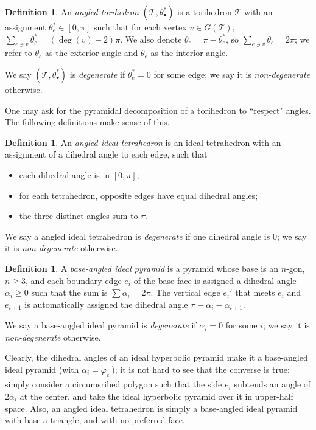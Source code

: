 \documentclass[11pt]{amsart}
\newcommand{\sT}{{\mathcal{T}}}
\newcommand{\vphi}{\varphi}
\theoremstyle{plain}
\theoremstyle{definition}
\newtheorem{define}[theorem]{Definition}
\newtheorem{definition}[theorem]{Definition}
\begin{document}
\begin{definition}
An \emph{angled torihedron} $(\sT, \theta_\bullet^*)$
is a torihedron $\sT$ with
an assignment $\theta_e^* \in [0,\pi]$
such that for each vertex $v \in G(\sT)$,
$\sum_{e \ni v} \theta_e^* = (\deg(v) - 2)\pi$.
We also denote $\theta_e = \pi - \theta_e^*$,
so $\sum_{e \ni v} \theta_e = 2\pi$;
we refer to $\theta_e$ as the exterior angle
and $\theta_e$ as the interior angle.


We say $(\sT, \theta_\bullet^*)$ is \emph{degenerate}
if $\theta_e^* = 0$ for some edge;
we say it is \emph{non-degenerate} otherwise.
\end{definition}


One may ask for the pyramidal decomposition of a torihedron
to ``respect" angles. The following definitions make sense of this.

\begin{define}
An \emph{angled ideal tetrahedron} is an ideal tetrahedron with an assignment of a dihedral angle
to each edge, such that
\begin{itemize}
\item each dihedral angle is in $[0, \pi]$;
\item for each tetrahedron, opposite edges have equal dihedral angles;
\item the three distinct angles sum to $\pi$.
\end{itemize}

We say a angled ideal tetrahedron is \emph{degenerate} if
one dihedral angle is 0; we say it is \emph{non-degenerate} otherwise.
\end{define}


\begin{define}
A \emph{base-angled ideal pyramid}
is a pyramid whose base is an $n$-gon, $n \geq 3$,
and each boundary edge $e_i$ of the base face is assigned a dihedral angle
$\alpha_i \geq 0$ such that the sum is $\sum \alpha_i = 2\pi$.
The vertical edge $e_i'$ that meets $e_i$ and $e_{i+1}$
is automatically assigned the dihedral angle $\pi - \alpha_i - \alpha_{i+1}$.


We say a base-angled ideal pyramid is \emph{degenerate} if
$\alpha_i = 0$ for some $i$; we say it is \emph{non-degenerate} otherwise.
\end{define}


Clearly, the dihedral angles of an ideal hyperbolic pyramid
make it a base-angled ideal pyramid
(with $\alpha_i = \vphi_{e_i}$);
it is not hard to see that the converse is true:
simply consider a circumsribed polygon such that the side $e_i$
subtends an angle of $2\alpha_i$ at the center,
and take the ideal hyperbolic pyramid over it in upper-half space.
Also, an angled ideal tetrahedron is simply a base-angled ideal pyramid
with base a triangle, and with no preferred face.
\end{document}
